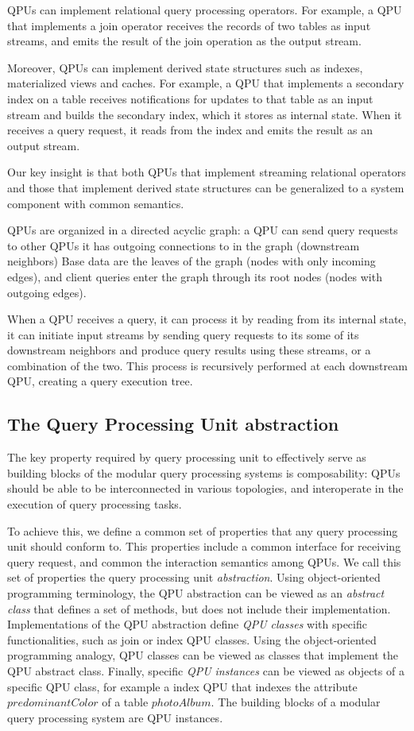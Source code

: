 QPUs can implement relational query processing operators.
For example, a QPU that implements a join operator receives the records of two tables as input streams,
and emits the result of the join operation as the output stream.

Moreover, QPUs can implement derived state structures such as indexes, materialized views and caches.
For example, a QPU that implements a secondary index on a table receives notifications for updates to that table as an
input stream and builds the secondary index, which it stores as internal state.
When it receives a query request, it reads from the index and emits the result as an output stream.

Our key insight is that both QPUs that implement streaming relational operators and those that implement derived state structures
can be generalized to a system component with common semantics.

QPUs are organized in a directed acyclic graph:
a QPU can send query requests to other QPUs it has outgoing connections to in the graph (downstream neighbors)
Base data are the leaves of the graph (nodes with only incoming edges),
and client queries enter the graph through its root nodes (nodes with outgoing edges).

When a QPU receives a query, it can process it by reading from its internal state, it can initiate input streams
by sending query requests to its some of its downstream neighbors and produce query results using these streams,
or a combination of the two.
This process is recursively performed at each downstream QPU, creating a query execution tree.


\subsection{The Query Processing Unit abstraction}

The key property required by query processing unit to effectively serve as building blocks of the modular query
processing systems is composability:
QPUs should be able to be interconnected in various topologies, and interoperate in the execution of query processing tasks.

To achieve this, we define a common set of properties that any query processing unit should conform to.
This properties include a common interface for receiving query request, and common the interaction semantics among QPUs.
We call this set of properties the query processing unit \textit{abstraction}.
Using object-oriented programming terminology, the QPU abstraction can be viewed as an \textit{abstract class}
that defines a set of methods, but does not include their implementation.
Implementations of the QPU abstraction define \textit{QPU classes} with specific functionalities,
such as join or index QPU classes.
Using the object-oriented programming analogy, QPU classes can be viewed as classes that implement the QPU
abstract class.
Finally, specific \textit{QPU instances} can be viewed as objects of a specific QPU class, for example a index QPU that
indexes the attribute $predominantColor$ of a table $photoAlbum$.
The building blocks of a modular query processing system are QPU instances.

